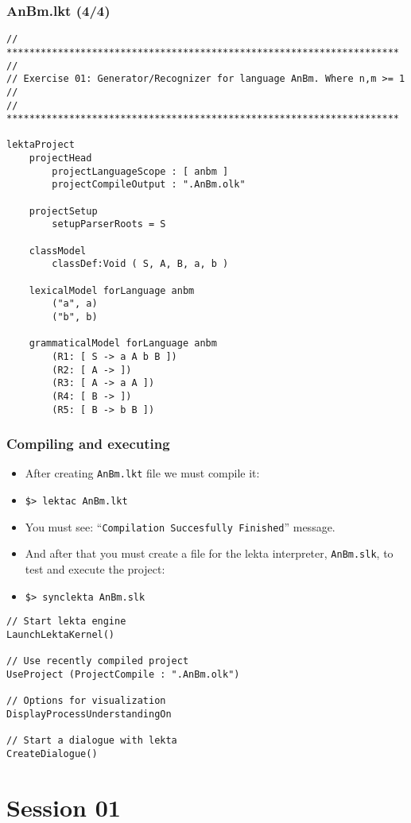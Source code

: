 \documentclass[11pt]{beamer}
\begin{document}
\begin{frame}[fragile]
\frametitle{AnBm.lkt (4/4)}
\tiny
\begin{lstlisting}[language=lekta]
// *********************************************************************
//
// Exercise 01: Generator/Recognizer for language AnBm. Where n,m >= 1
//
// *********************************************************************

lektaProject
	projectHead
		projectLanguageScope : [ anbm ]
		projectCompileOutput : ".AnBm.olk"

	projectSetup
		setupParserRoots = S

	classModel
		classDef:Void ( S, A, B, a, b )

	lexicalModel forLanguage anbm
		("a", a)
		("b", b)

	grammaticalModel forLanguage anbm
		(R1: [ S -> a A b B ])
		(R2: [ A -> ])
		(R3: [ A -> a A ])
		(R4: [ B -> ])
		(R5: [ B -> b B ])
\end{lstlisting}
\end{frame}

\begin{frame}[fragile]
\frametitle{Compiling and executing}
\begin{itemize}
	\item After creating \texttt{AnBm.lkt} file we must compile it:
	\pause
	\item \texttt{\$> lektac AnBm.lkt}
	\pause
	\item You must see: ``\texttt{Compilation Succesfully Finished}'' message.
	\pause
	\item And after that you must create a file for the lekta interpreter, \texttt{AnBm.slk}, to test and execute the project:
	\pause
	\item \texttt{\$> synclekta AnBm.slk}
\end{itemize}
\tiny
\begin{lstlisting}[language=lekta]
// Start lekta engine
LaunchLektaKernel()

// Use recently compiled project
UseProject (ProjectCompile : ".AnBm.olk")

// Options for visualization
DisplayProcessUnderstandingOn

// Start a dialogue with lekta
CreateDialogue()
\end{lstlisting}
\end{frame}

\section{Session 01}
\end{document}
